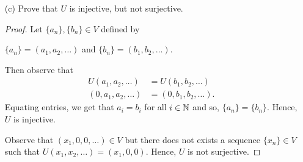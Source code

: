 \begin{enumerate}
\begin{proof}
        To see why \( T  \) is not injective, suppose we take two sequences distinct \( \{ x_{n} \} , \{ y_{n} \}  \in V  \) defined by
        \begin{center}
            \( \{ x_{n}  \}  = (a, 0, 0 , \dots ) \) and \( \{ y_{n} \}  = (b, 0, 0 , \dots ) \)
        \end{center}
        respectively. But we have \( T(\{ x_{n} \} ) = 0_{n} = T(\{ y_{n} \} ) \) where \( 0_{n}  \) is the sequence with all terms being zero. Hence, \( T  \) cannot be injective.
    \end{proof}
    \item[(c)] Prove that \( U  \) is injective, but not surjective.
        \begin{proof}
        Let \( \{ a_{n} \} , \{ b_{n} \}  \in V  \) defined by 
        \begin{center}
            \( \{ a_{n} \} = (a_{1}, a_{2}, \dots )  \) and \( \{ b_{n} \}  = (b_{1}, b_{2}, \dots) \).
        \end{center}
        Then observe that
        \begin{align*}
           U(a_{1}, a_{2}, \dots ) &= U(b_{1}, b_{2}, \dots ) \\
           (0, a_{1}, a_{2}, \dots ) &= (0, b_{1}, b_{2}, \dots ).
        \end{align*}
        Equating entries, we get that \( a_{i} = b_{i}   \) for all \( i \in \mathbb{N}  \) and so, \( \{ a_{n} \} = \{ b_{n} \}  \). Hence, \( U  \) is injective.

         Observe that \( (x_{1}, 0, 0, \dots ) \in V  \) but there does not exists a sequence \( \{ x_{n} \} \in V  \) such that \( U(x_{1}, x_{2}, \dots ) = (x_{1}, 0, 0 ) \). Hence, \( U  \) is not surjective.
        \end{proof}
\end{enumerate}

